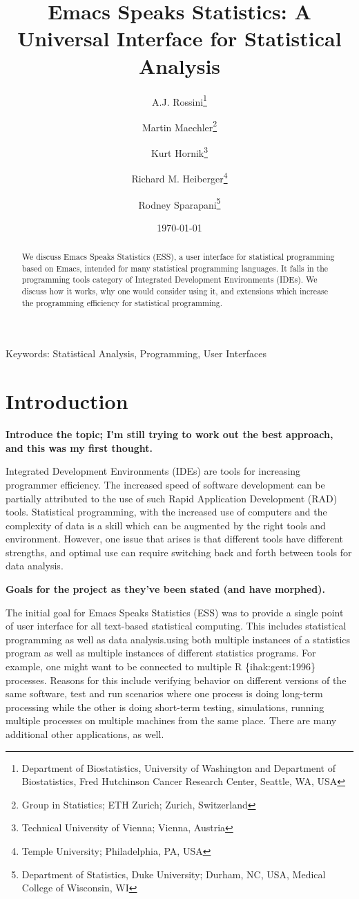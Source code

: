 \documentclass{article}
\title{Emacs Speaks Statistics: A Universal Interface for
  Statistical Analysis}
\author{A.J. Rossini\footnote{Department of Biostatistics, University
    of Washington and Department of Biostatistics, Fred Hutchinson
    Cancer Research Center, Seattle, WA, USA} \and Martin
  Maechler\footnote{Group  in Statistics; ETH Zurich; Zurich,
    Switzerland} \and Kurt 
  Hornik\footnote{Technical University of Vienna; Vienna, Austria} \and
  Richard M. Heiberger\footnote{Temple University; Philadelphia, PA,
    USA} \and Rodney Sparapani\footnote{Department of Statistics, Duke
    University; Durham, NC, USA, Medical College of Wisconsin, WI}}
\date{\today}
\newcommand{\citep}[1]{{\{\sf#1\}}}
\newif\ifpdf
\begin{document}
\ifpdf
  \DeclareGraphicsExtensions{.jpg,.pdf,.png,.mps}
\fi


\maketitle

Keywords: Statistical Analysis, Programming, User Interfaces

\begin{abstract}
  We discuss Emacs Speaks Statistics (ESS), a user interface for
  statistical programming based on Emacs, intended for many
  statistical programming languages.  It falls in the programming
  tools category of Integrated Development Environments (IDEs).  We
  discuss how it works, why one would consider using it, and
  extensions which increase the programming efficiency for statistical
  programming.
\end{abstract}

\section{Introduction}
\label{sec:intro}

\textbf{Introduce the topic; I'm still trying to work out the best
approach, and this was my first thought.}

Integrated Development Environments (IDEs) are tools for increasing
programmer efficiency.  The increased speed of software development
can be partially attributed to the use of such Rapid Application
Development (RAD) tools.  Statistical programming, with the increased
use of computers and the complexity of data is a skill which can be
augmented by the right tools and environment.  However, one issue that
arises is that different tools have different strengths, and optimal
use can require switching back and forth between tools for data
analysis.

\textbf{Goals for the project as they've been stated (and have morphed).}

The initial goal for Emacs Speaks Statistics (ESS) was to provide a
single point of user interface for all text-based statistical
computing.  This includes statistical programming as well as data
analysis.using both multiple instances of a statistics program as well
as multiple instances of different statistics programs.  For example,
one might want to be connected to multiple R \citep{ihak:gent:1996}
processes.  Reasons for this include verifying behavior on different
versions of the same software, test and run scenarios where one
process is doing long-term processing while the other is doing
short-term testing, simulations, running multiple processes on
multiple machines from the same place.  There are many additional
other applications, as well.
\end{document}

